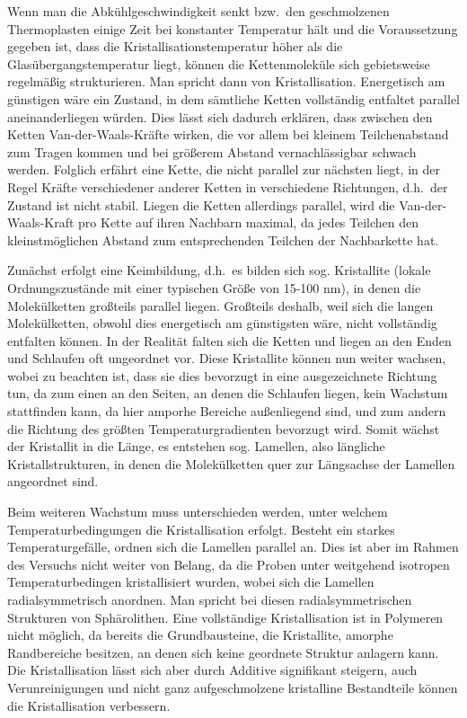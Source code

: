 \documentclass[bigchapter,colorback,accentcolor=tud4b,linedtoc,11pt]{tudreport}
\begin{document}
Wenn man die Abkühlgeschwindigkeit senkt bzw.\ den geschmolzenen Thermoplasten einige Zeit bei konstanter Temperatur hält und die Voraussetzung gegeben ist, dass die Kristallisationstemperatur höher als die Glasübergangstemperatur liegt, können die Kettenmoleküle sich gebietsweise regelmäßig strukturieren. Man spricht dann von Kristallisation. Energetisch am günstigen wäre ein Zustand, in dem sämtliche Ketten vollständig entfaltet parallel aneinanderliegen würden. Dies lässt sich dadurch erklären, dass zwischen den Ketten Van-der-Waals-Kräfte wirken, die vor allem bei kleinem Teilchenabstand zum Tragen kommen und bei größerem Abstand vernachlässigbar schwach werden. Folglich erfährt eine Kette, die nicht parallel zur nächsten liegt, in der Regel Kräfte verschiedener anderer Ketten in verschiedene Richtungen, d.h.\ der Zustand ist nicht stabil. Liegen die Ketten allerdings parallel, wird die Van-der-Waals-Kraft pro Kette auf ihren Nachbarn maximal, da jedes Teilchen den kleinstmöglichen Abstand zum entsprechenden Teilchen der Nachbarkette hat.

Zunächst erfolgt eine Keimbildung, d.h.\ es bilden sich sog. Kristallite (lokale Ordnungszustände mit einer typischen Größe von 15-100 nm), in denen die Molekülketten großteils parallel liegen. Großteils deshalb, weil sich die langen Molekülketten, obwohl dies energetisch am günstigsten wäre, nicht vollständig entfalten können. In der Realität falten sich die Ketten und liegen an den Enden und Schlaufen oft ungeordnet vor. Diese Kristallite können nun weiter wachsen, wobei zu beachten ist, dass sie dies bevorzugt in eine ausgezeichnete Richtung tun, da zum einen an den Seiten, an denen die Schlaufen liegen, kein Wachstum stattfinden kann, da hier amporhe Bereiche außenliegend sind, und zum andern die Richtung des größten Temperaturgradienten bevorzugt wird. Somit wächst der Kristallit in die Länge, es entstehen sog. Lamellen, also längliche Kristallstrukturen, in denen die Molekülketten quer zur Längsachse der Lamellen angeordnet sind.

Beim weiteren Wachstum muss unterschieden werden, unter welchem Temperaturbedingungen die Kristallisation erfolgt. Besteht ein starkes Temperaturgefälle, ordnen sich die Lamellen parallel an. Dies ist aber im Rahmen des Versuchs nicht weiter von Belang, da die Proben unter weitgehend isotropen Temperaturbedingen kristallisiert wurden, wobei sich die Lamellen radialsymmetrisch anordnen. Man spricht bei diesen radialsymmetrischen Strukturen von Sphärolithen. Eine vollständige Kristallisation ist in Polymeren nicht möglich, da bereits die Grundbausteine, die Kristallite, amorphe Randbereiche besitzen, an denen sich keine geordnete Struktur anlagern kann. Die Kristallisation lässt sich aber durch Additive signifikant steigern, auch Verunreinigungen und nicht ganz aufgeschmolzene kristalline Bestandteile können die Kristallisation verbessern.
\end{document}
